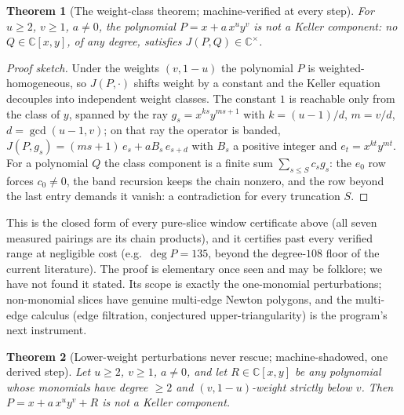 \documentclass[11pt]{article}
\newtheorem{theorem}{Theorem}[section]
\theoremstyle{definition}
\theoremstyle{remark}
\newcommand{\C}{\mathbb{C}}
\begin{document}
\begin{theorem}[The weight-class theorem; machine-verified at every step]\label{thm:weightclass}
For $u \ge 2$, $v \ge 1$, $a \ne 0$, the polynomial $P = x + a\,x^u y^v$ is not a Keller
component: no $Q \in \C[x,y]$, of any degree, satisfies $J(P,Q) \in \C^\times$.
\end{theorem}

\begin{proof}[Proof sketch]
Under the weights $(v, 1-u)$ the polynomial $P$ is weighted-homogeneous, so $J(P, \cdot)$
shifts weight by a constant and the Keller equation decouples into independent weight
classes. The constant $1$ is reachable only from the class of $y$, spanned by the ray
$g_s = x^{ks} y^{ms+1}$ with $k = (u-1)/d$, $m = v/d$, $d = \gcd(u-1, v)$; on that ray the
operator is banded, $J(P, g_s) = (ms+1)\,e_s + a B_s\,e_{s+d}$ with $B_s$ a positive
integer and $e_t = x^{kt} y^{mt}$. For a polynomial $Q$ the class component is a finite sum
$\sum_{s \le S} c_s g_s$: the $e_0$ row forces $c_0 \ne 0$, the band recursion keeps the
chain nonzero, and the row beyond the last entry demands it vanish: a contradiction for
every truncation $S$.
\end{proof}

This is the closed form of every pure-slice window certificate above (all seven measured
pairings are its chain products), and it certifies past every verified range at negligible
cost (e.g.\ $\deg P = 135$, beyond the degree-$108$ floor of the current literature). The
proof is elementary once seen and may be folklore; we have not found it stated. Its scope is
exactly the one-monomial perturbations; non-monomial slices have genuine multi-edge Newton
polygons, and the multi-edge calculus (edge filtration, conjectured upper-triangularity) is
the program's next instrument.

\begin{theorem}[Lower-weight perturbations never rescue; machine-shadowed, one derived step]
\label{thm:perturbed}
Let $u \ge 2$, $v \ge 1$, $a \ne 0$, and let $R \in \C[x,y]$ be any polynomial whose
monomials have degree $\ge 2$ and $(v, 1-u)$-weight strictly below $v$. Then
$P = x + a\,x^u y^v + R$ is not a Keller component.
\end{theorem}
\end{document}
